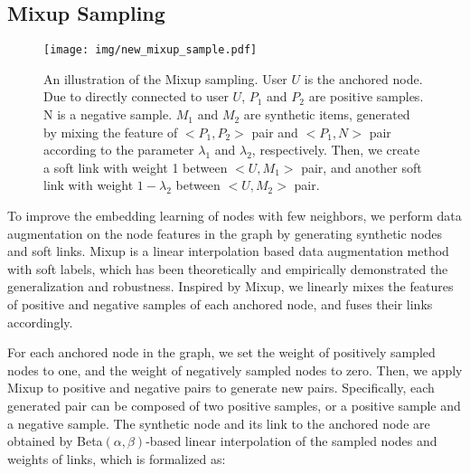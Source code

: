 


\subsection{\textbf{Mixup Sampling}}

\begin{figure}[t]
    \centering
    
    \texttt{[image: img/new\_mixup\_sample.pdf]}
    \caption{An illustration of the Mixup sampling. User \(U\) is the anchored node.  Due to directly connected to user \(U\),  \(P_1\) and \(P_2\) are positive samples. N is a negative sample. \(M_1\) and \(M_2\) are synthetic items, generated by mixing the feature of $<P_1, P_2>$ pair and $<P_1, N>$ pair according to the parameter \(\lambda_1\) and \(\lambda_2\), respectively. Then, we create a soft link with weight 1 between $<U, M_1>$ pair, and another soft link with weight $1-\lambda_2$ between $<U, M_2>$ pair. }
    \label{fig:mix_sam}
\end{figure}

To improve the embedding learning of nodes with few neighbors, we perform data augmentation on the node features in the graph by generating synthetic nodes and soft links. Mixup \cite{mixup} is a linear interpolation based data augmentation method with soft labels, which has been theoretically and empirically demonstrated the generalization and robustness.
Inspired by Mixup, we linearly mixes the features of positive and negative samples of each anchored node, and fuses their links accordingly.
 

For each anchored node in the graph, 
we set the weight of positively sampled nodes to one, and the weight of negatively sampled nodes to zero.
Then, we apply Mixup to positive and negative pairs to generate new pairs.
Specifically, each generated pair can be composed of two positive samples, or a positive sample and a negative sample.
The synthetic node and its link to the anchored node are obtained by Beta$(\alpha, \beta)$-based linear interpolation of the sampled nodes and weights of links, which is formalized as:

